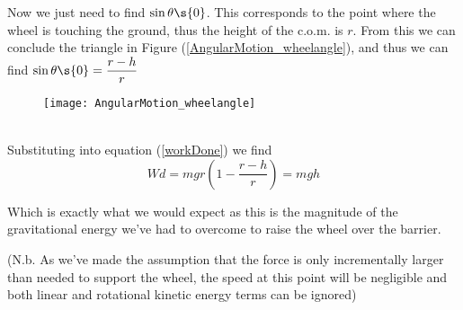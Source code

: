 \begin{problem}
{Now we just need to find $\sin{\theta\s{0}}$. This corresponds to the point where the wheel is touching the ground, thus the height of the c.o.m. is $r$. From this we can conclude the triangle in Figure (\ref{AngularMotion_wheelangle}), and thus we can find $\sin{\theta\s{0}} = \dfrac{r-h}{r}$
\begin{figure}[h]
\centering
\texttt{[image: AngularMotion\_wheelangle]}
\caption{}
\label{fig:AngularMotion_wheelangle}
\end{figure}
\\
Substituting into equation (\ref{workDone}) we find
\begin{equation*}
Wd =mgr\left(1 - \dfrac{r-h}{r} \right) = mgh
\end{equation*}

Which is exactly what we would expect as this is the magnitude of the gravitational energy we've had to overcome to raise the wheel over the barrier. 

(N.b. As we've made the assumption that the force is only incrementally larger than needed to support the wheel, the speed at this point will be negligible and both linear and rotational kinetic energy terms can be ignored)
}
\end{problem}
